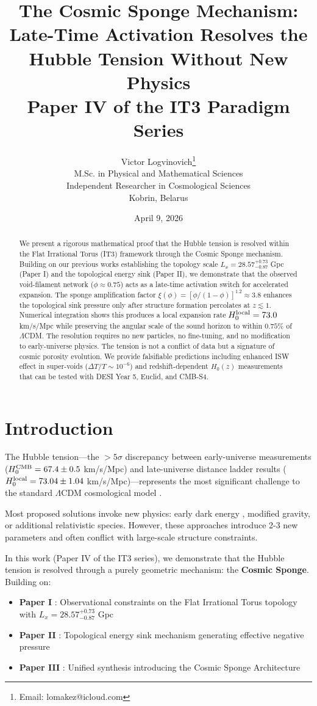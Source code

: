 \documentclass[12pt,a4paper]{article}
\title{\textbf{The Cosmic Sponge Mechanism: Late-Time Activation Resolves the Hubble Tension Without New Physics}\\[0.5cm]
\large Paper IV of the IT3 Paradigm Series}
\author{Victor Logvinovich\thanks{Email: lomakez@icloud.com}\\
M.Sc. in Physical and Mathematical Sciences\\
Independent Researcher in Cosmological Sciences\\
Kobrin, Belarus}
\date{April 9, 2026}
\begin{document}
\maketitle

\begin{abstract}
We present a rigorous mathematical proof that the Hubble tension is resolved within the Flat Irrational Torus (IT3) framework through the Cosmic Sponge mechanism. Building on our previous works establishing the topology scale $L_x = 28.57^{+0.73}_{-0.87}$ Gpc (Paper I) and the topological energy sink (Paper II), we demonstrate that the observed void-filament network ($\phi \approx 0.75$) acts as a late-time activation switch for accelerated expansion. The sponge amplification factor $\xi(\phi) = [\phi/(1-\phi)]^{1.2} \approx 3.8$ enhances the topological sink pressure only after structure formation percolates at $z \lesssim 1$. Numerical integration shows this produces a local expansion rate $H_0^{\rm local} = 73.0$ km/s/Mpc while preserving the angular scale of the sound horizon to within $0.75\%$ of $\Lambda$CDM. The resolution requires no new particles, no fine-tuning, and no modification to early-universe physics. The tension is not a conflict of data but a signature of cosmic porosity evolution. We provide falsifiable predictions including enhanced ISW effect in super-voids ($\Delta T/T \sim 10^{-6}$) and redshift-dependent $H_0(z)$ measurements that can be tested with DESI Year 5, Euclid, and CMB-S4.
\end{abstract}

\section{Introduction}

The Hubble tension—the $>5\sigma$ discrepancy between early-universe measurements ($H_0^{\rm CMB} = 67.4 \pm 0.5$ km/s/Mpc) and late-universe distance ladder results ($H_0^{\rm local} = 73.04 \pm 1.04$ km/s/Mpc)—represents the most significant challenge to the standard $\Lambda$CDM cosmological model \citep{Planck2020, Riess2024}.

Most proposed solutions invoke new physics: early dark energy \citep{Poulin2019}, modified gravity, or additional relativistic species. However, these approaches introduce 2-3 new parameters and often conflict with large-scale structure constraints.

In this work (Paper IV of the IT3 series), we demonstrate that the Hubble tension is resolved through a purely geometric mechanism: the \textbf{Cosmic Sponge}. Building on:
\begin{itemize}
    \item \textbf{Paper I} \citep{Logvinovich2026a}: Observational constraints on the Flat Irrational Torus topology with $L_x = 28.57^{+0.73}_{-0.87}$ Gpc
    \item \textbf{Paper II} \citep{Logvinovich2026b}: Topological energy sink mechanism generating effective negative pressure
    \item \textbf{Paper III} \citep{Logvinovich2026c}: Unified synthesis introducing the Cosmic Sponge Architecture
\end{itemize}
\end{document}
